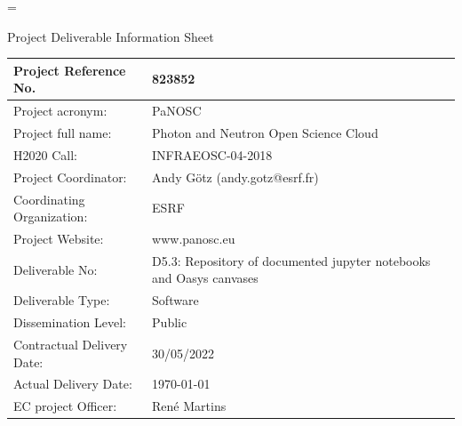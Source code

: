 \documentclass[11pt, a4paper]{article}
\edef\restoreparindent{\parindent=\the\parindent\relax}
\begin{document}
\fancyfoot{} %
\fancyfoot[R]{\thepage}


{ %
\restoreparindent

{\sffamily\huge Project Deliverable Information Sheet \par}

\begin{center}
\begin{tabular}{ | m{5.2cm}| m{10.7cm} | }
\hline
Project Reference No. & 823852 \\
\hline
Project acronym: & PaNOSC \\
\hline
Project full name: & Photon and Neutron Open Science Cloud \\
\hline
H2020 Call: & INFRAEOSC-04-2018 \\
\hline
Project Coordinator: & Andy Götz (andy.gotz@esrf.fr) \\
\hline
Coordinating Organization: & ESRF \\
\hline
Project Website: & www.panosc.eu \\
\hline
Deliverable No: & D5.3: Repository of documented jupyter notebooks and Oasys canvases \\
\hline
Deliverable Type: & Software \\
\hline
Dissemination Level: & Public \\
\hline
Contractual Delivery Date: & 30/05/2022 \\
\hline
Actual Delivery Date: & \today \\
\hline
EC project Officer: & Ren\'e Martins \\
\hline
\end{tabular}
\end{center}

}
\end{document}
